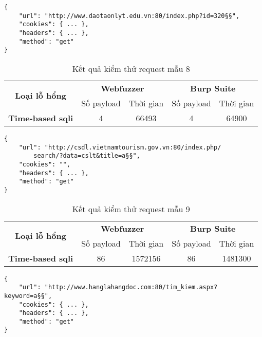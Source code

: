\FloatBarrier
\begin{lstlisting}[style=ES6, label={lst:base-request-8}, caption={Request mẫu 8 có lỗ hổng time-based \acrshort{sqli}}]
{
    "url": "http://www.daotaonlyt.edu.vn:80/index.php?id=320§§",
    "cookies": { ... },
    "headers": { ... },
    "method": "get"
}
\end{lstlisting}
\FloatBarrier
\begin{table}[ht]
    \centering
    \caption{Kết quả kiểm thử request mẫu 8}
    \label{tab:testing-result-8}
    \begin{tabular}[ht]{ccccc}
        \toprule[1pt]\midrule[0.3pt]
            \multirow{2}{*}{\textbf{Loại lỗ hổng}}&\multicolumn{2}{c}{\textbf{Webfuzzer}}&\multicolumn{2}{c}{\textbf{Burp Suite}}\\
            \cmidrule(lr){2-3}\cmidrule(lr){4-5}{}&Số payload&Thời gian&Số payload&Thời gian\\
        \midrule[0.3pt]
            \textbf{Time-based \acrshort{sqli}}&4&66493&4&64900\\
        \midrule[0.3pt]\bottomrule[1pt]
    \end{tabular}
\end{table}
\FloatBarrier
\begin{lstlisting}[style=ES6, label={lst:base-request-9}, caption={Request mẫu 9 có lỗ hổng time-based \acrshort{sqli}}]
{
    "url": "http://csdl.vietnamtourism.gov.vn:80/index.php/
        search/?data=cslt&title=a§§",
    "cookies": "",
    "headers": { ... },
    "method": "get"
}
\end{lstlisting}
\FloatBarrier
\begin{table}[ht]
    \centering
    \caption{Kết quả kiểm thử request mẫu 9}
    \label{tab:testing-result-9}
    \begin{tabular}[ht]{ccccc}
        \toprule[1pt]\midrule[0.3pt]
            \multirow{2}{*}{\textbf{Loại lỗ hổng}}&\multicolumn{2}{c}{\textbf{Webfuzzer}}&\multicolumn{2}{c}{\textbf{Burp Suite}}\\
            \cmidrule(lr){2-3}\cmidrule(lr){4-5}{}&Số payload&Thời gian&Số payload&Thời gian\\
        \midrule[0.3pt]
            \textbf{Time-based \acrshort{sqli}}&86&1572156&86&1481300\\
        \midrule[0.3pt]\bottomrule[1pt]
    \end{tabular}
\end{table}
\FloatBarrier
\begin{lstlisting}[style=ES6, label={lst:base-request-10}, caption={Request mẫu 10 có lỗ hổng time-based \acrshort{sqli}}]
{
    "url": "http://www.hanglahangdoc.com:80/tim_kiem.aspx?keyword=a§§",
    "cookies": { ... },
    "headers": { ... },
    "method": "get"
}
\end{lstlisting}
